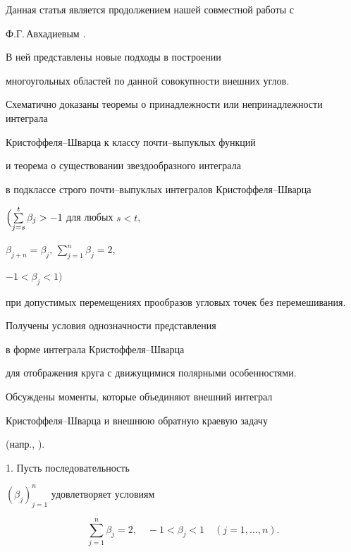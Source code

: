 

 


\maketitle 


 




 


Данная статья является продолжением нашей совместной работы с


Ф.Г.\,Авхадиевым \cite{Av}.


В ней представлены новые подходы в построении


многоугольных областей по данной совокупности внешних углов.


Схематично доказаны теоремы о принадлежности или непринадлежности интеграла


Крис\-тоф\-фе\-ля--Швар\-ца к классу почти--выпуклых функций


и теорема о существовании звездообразного интеграла


в подклассе строго почти--выпуклых интегралов Крис\-тоф\-фе\-ля--Швар\-ца


$\Bigl(\sum\limits_{j=s}^{t}\beta_{j}>-1$ для любых $s<t$,


$\beta_{j+n}=\beta_{j}$, $\sum\limits_{j=1}^{n}\beta_{j}=2$,


$-1<\beta_{j}<1\Bigr)$


при допустимых перемещениях прообразов угловых точек без перемешивания.


Получены условия однозначности представления


в форме интеграла Крис\-тоф\-фе\-ля--Швар\-ца


для отображения круга с движущимися полярными особенностями.


Обсуждены моменты, которые объединяют внешний интеграл


Крис\-тоф\-фе\-ля--Швар\-ца и внешнюю обратную краевую задачу


(напр., \cite{Vid}).





1. Пусть последовательность


$(\beta _{j})_{j=1}^{n}$ удовлетворяет условиям


\begin{equation}


\sum_{j=1}^{n}\beta _{j}=2,\quad


-1<\beta_{j}<1 \quad


(j=1,\dotsc,n).


\end{equation}


